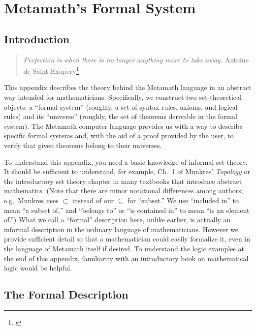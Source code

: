 \chapter{Metamath's Formal System}\label{formalspec}

\section{Introduction}

\begin{quote}
  {\em Perfection is when there is no longer anything more to take away.}
    \flushright\sc Antoine de
     Saint-Exupery\footnote{\cite[p.~3-25]{Campbell}}\\
\end{quote}

This appendix describes the theory behind the Metamath language in an abstract
way intended for mathematicians.  Specifically, we construct two
set-theo\-ret\-i\-cal objects:  a ``formal system'' (roughly, a set of syntax
rules, axioms, and logical rules) and its ``universe'' (roughly, the set of
theorems derivable in the formal system).  The Metamath computer language
provides us with a way to describe specific formal systems and, with the aid of
a proof provided by the user, to verify that given theorems
belong to their universes.

To understand this appendix, you need a basic knowledge of informal set theory.
It should be sufficient to understand, for example, Ch.\ 1 of Munkres' {\em
Topology} \cite{Munkres} or the
introductory set theory chapter
in many textbooks that introduce abstract mathematics. (Note that there are
minor notational differences among authors; e.g.\ Munkres uses $\subset$ instead
of our $\subseteq$ for ``subset.''  We use ``included in'' to mean ``a subset
of,'' and ``belongs to'' or ``is contained in'' to mean ``is an element of.'')
What we call a ``formal'' description here, unlike earlier, is actually an
informal description in the ordinary language of mathematicians.  However we
provide sufficient detail so that a mathematician could easily formalize it,
even in the language of Metamath itself if desired.  To understand the logic
examples at the end of this appendix, familiarity with an introductory book on
mathematical logic would be helpful.

\section{The Formal Description}

